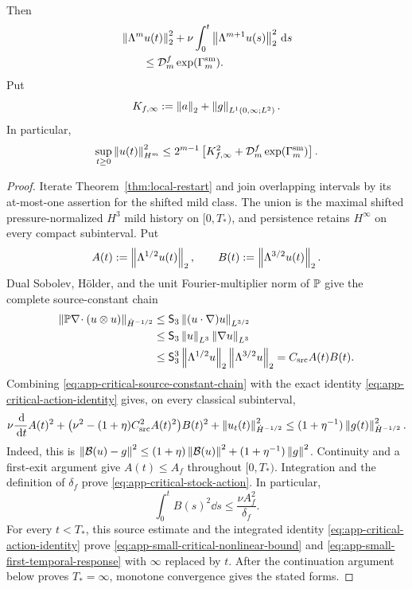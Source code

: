 \begin{theorem}
\begin{align}
\end{align}
Then
\begin{align}
 &\left\lVert \Lambda^mu(t)\right\rVert_2^2
 +\nu\int_0^t\left\lVert \Lambda^{m+1}u(s)\right\rVert_2^2\,\mathrm d s
 \notag\\
 &\qquad\le
 \mathcal D_m^f\exp(\Gamma_m^{\rm sm}).
 \label{eq:app-small-data-finite-order}
\end{align}
Put
\[
 K_{f,\infty}:=\left\lVert a\right\rVert_2+\left\lVert g\right\rVert_{L^1(0,\infty;L^2)}.
\]
In particular,
\begin{equation}
 \sup_{t\ge0}\left\lVert u(t)\right\rVert_{H^m}^2
 \le
 2^{m-1}\left[
 K_{f,\infty}^2+
 \mathcal D_m^f\exp(\Gamma_m^{\rm sm})
 \right].
 \label{eq:app-small-data-Hm}
\end{equation}
\end{theorem}

\begin{proof}
Iterate Theorem~\ref{thm:local-restart} and join overlapping intervals by
its at-most-one assertion for the shifted mild class.  The union is the
maximal shifted pressure-normalized \(H^3\) mild history on \([0,T_*)\), and
persistence retains \(H^\infty\) on
every compact subinterval.  Put
\[
 A(t):=\left\lVert \Lambda^{1/2}u(t)\right\rVert_2,
 \qquad
 B(t):=\left\lVert \Lambda^{3/2}u(t)\right\rVert_2.
\]
 Dual Sobolev, H\"older, and the unit Fourier-multiplier norm of \(\mathbb P\)
give the complete source-constant chain
\begin{align}
 \left\lVert \mathbb P\nabla\!\cdot(u\otimes u)\right\rVert_{\dot H^{-1/2}}
 &\le \mathsf S_3\left\lVert (u\cdot\nabla)u\right\rVert_{L^{3/2}}
 \notag\\
 &\le \mathsf S_3\left\lVert u\right\rVert_{L^3}\left\lVert \nabla u\right\rVert_{L^3}
 \notag\\
 &\le \mathsf S_3^3
      \left\lVert \Lambda^{1/2}u\right\rVert_2
      \left\lVert \Lambda^{3/2}u\right\rVert_2
 =C_{\rm src}A(t)B(t).
 \label{eq:app-critical-source-constant-chain}
\end{align}
Combining \eqref{eq:app-critical-source-constant-chain} with the exact
identity \eqref{eq:app-critical-action-identity} gives, on every classical
subinterval,
\[
 \nu\frac{\,\mathrm d}{\,\mathrm d t}A(t)^2
 +\bigl(\nu^2-(1+\eta)C_{\rm src}^2A(t)^2\bigr)B(t)^2
 +\left\lVert u_t(t)\right\rVert_{\dot H^{-1/2}}^2
 \le(1+\eta^{-1})\left\lVert g(t)\right\rVert_{\dot H^{-1/2}}^2.
\]
Indeed, this is
\(\left\lVert \mathcal B(u)-g\right\rVert^2\le
(1+\eta)\left\lVert \mathcal B(u)\right\rVert^2
+(1+\eta^{-1})\left\lVert g\right\rVert^2\).
Continuity and a first-exit argument give \(A(t)\le A_f\) throughout
\([0,T_*)\).  Integration and the definition of \(\delta_f\) prove
\eqref{eq:app-critical-stock-action}.  In particular,
\[
 \int_0^tB(s)^2\dd s\le\frac{\nu A_f^2}{\delta_f}.
\]
For every \(t<T_*\), this source estimate and the integrated identity
\eqref{eq:app-critical-action-identity} prove
\eqref{eq:app-small-critical-nonlinear-bound} and
\eqref{eq:app-small-first-temporal-response} with \(\infty\) replaced by
\(t\).  After the continuation argument below proves \(T_*=\infty\),
monotone convergence gives the stated forms.


\end{proof}
